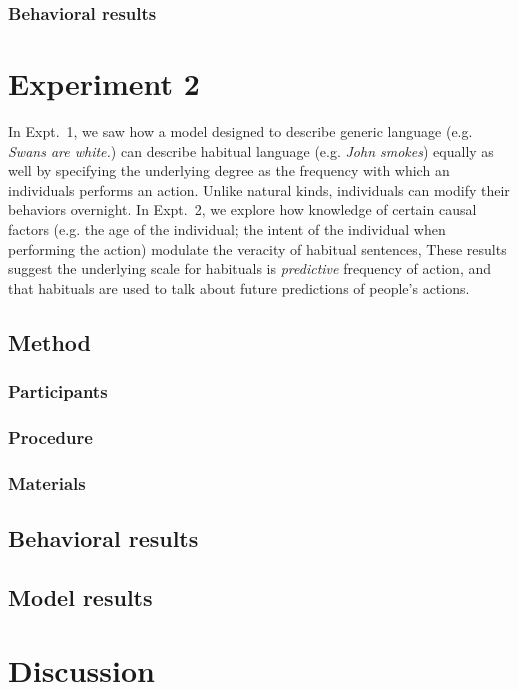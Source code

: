 \documentclass[10pt,letterpaper]{article}
\begin{document}
\subsubsection{Behavioral results}



\section{Experiment 2}

In Expt.~1, we saw how a model designed to describe generic language (e.g. \emph{Swans are white.}) can describe habitual language (e.g. \emph{John smokes}) equally as well by specifying the underlying degree as the frequency with which an individuals performs an action.
Unlike natural kinds, individuals can modify their behaviors overnight.  
In Expt.~2, we explore how knowledge of certain causal factors (e.g. the age of the individual; the intent of the individual when performing the action) modulate the veracity of habitual sentences, 
These results suggest the underlying scale for habituals is \emph{predictive} frequency of action, and that habituals are used to talk about future predictions of people's actions.

\subsection{Method}


\subsubsection{Participants}
\subsubsection{Procedure}
\subsubsection{Materials}

\subsection{Behavioral results}

\subsection{Model results}



\section{Discussion}



\setlength{\bibleftmargin}{.125in}
\setlength{\bibindent}{-\bibleftmargin}


\end{document}
